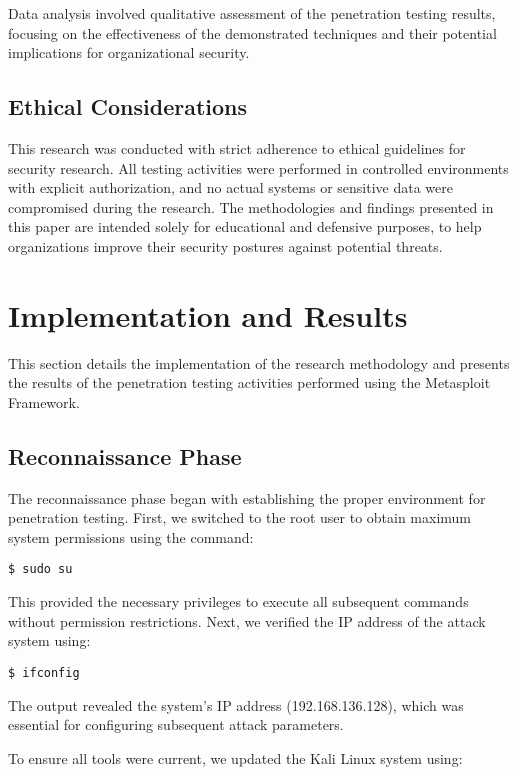 \documentclass[journal,twoside]{IEEEtran}
\begin{document}
Data analysis involved qualitative assessment of the penetration testing results, focusing on the effectiveness of the demonstrated techniques and their potential implications for organizational security.

\subsection{Ethical Considerations}
This research was conducted with strict adherence to ethical guidelines for security research. All testing activities were performed in controlled environments with explicit authorization, and no actual systems or sensitive data were compromised during the research. The methodologies and findings presented in this paper are intended solely for educational and defensive purposes, to help organizations improve their security postures against potential threats.

\section{Implementation and Results}
This section details the implementation of the research methodology and presents the results of the penetration testing activities performed using the Metasploit Framework.

\subsection{Reconnaissance Phase}
The reconnaissance phase began with establishing the proper environment for penetration testing. First, we switched to the root user to obtain maximum system permissions using the command:

\begin{verbatim}
$ sudo su
\end{verbatim}

This provided the necessary privileges to execute all subsequent commands without permission restrictions. Next, we verified the IP address of the attack system using:

\begin{verbatim}
$ ifconfig
\end{verbatim}

The output revealed the system's IP address (192.168.136.128), which was essential for configuring subsequent attack parameters.

To ensure all tools were current, we updated the Kali Linux system using:
\end{document}
